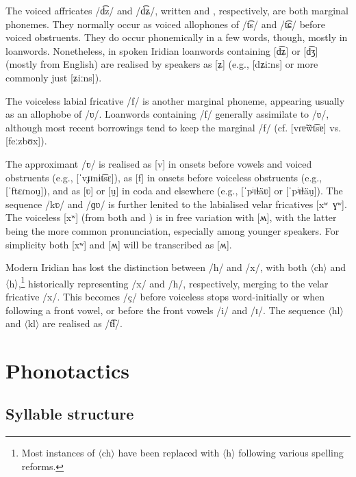 The voiced affricates /d͡z/ and /d͡ʑ/, written  and ,
respectively, are both marginal phonemes. They normally occur as voiced
allophones of  /t͡s/ and /t͡ɕ/ before voiced obstruents. They do occur
phonemically in a few words, though, mostly in loanwords. Nonetheless, in spoken
Iridian loanwords containing [d͡ʑ] or [d͡ʒ] (mostly from English) are realised
by speakers as [ʑ] (e.g.,  [dʑiːns] or more commonly just
[ʑiːns]).


The voiceless labial fricative /f/ is another marginal phoneme, appearing
usually as an allophobe of /ʋ/. Loanwords containing /f/ generally assimilate to
/ʋ/, although most recent borrowings tend to keep the marginal /f/ (cf.
 [vɾɐ̃w̃t͡sɐ] vs.  [feːzbʊx]).

The approximant /ʋ/ is realised as [v] in onsets before vowels and voiced
obstruents (e.g.,  [ˈvɟɪnɨt͡sɛ]), as [f] in
onsets before voiceless obstruents (e.g.,  [ˈftɛɾnou̯]),
and as [ʋ] or [u̯] in coda and elsewhere (e.g.,  [ˈpʲɪɫäʋ]
or [ˈpʲɪɫäu̯]). The sequence /kʋ/ and /ɡʋ/ is further lenited to the labialised
velar fricatives [xʷ~ɣʷ]. The voiceless [xʷ] (from both  and )
is in free variation with [ʍ], with the latter being the more common
pronunciation, especially among younger speakers. For simplicity both [xʷ] and
[ʍ] will be transcribed as [ʍ].

Modern Iridian has lost the distinction between /h/ and /x/, with both
$\langle$ch$\rangle$ and $\langle$h$\rangle$,\footnote{Most instances of
$\langle$ch$\rangle$ have been replaced with $\langle$h$\rangle$ following
various spelling reforms.} historically representing /x/ and /h/, respectively,
merging to the velar fricative /x/. This becomes /ç/ before voiceless stops
word-initially or when following a front vowel, or before the front vowels /i/
and /ɪ/. The sequence $\langle$hl$\rangle$ and $\langle$kl$\rangle$ are realised
as /t͡ɬ/.


\section{Phonotactics}\label{sec:phonotactics}

\subsection{Syllable structure}\label{sec:syllable-structure}

